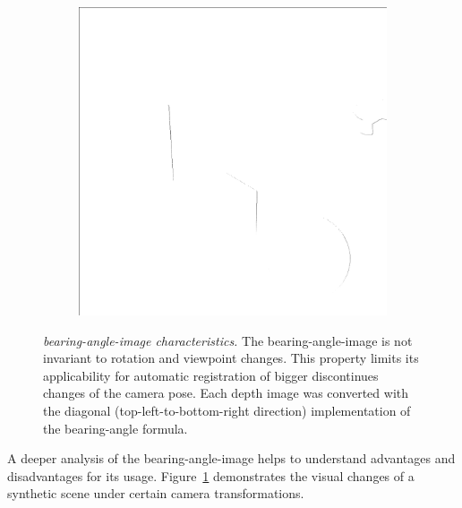 \begin{figure}[b!]
\begin{subfigure}[t]{0.32\textwidth}
    \end{subfigure}
    \begin{subfigure}[t]{0.32\textwidth}
        \includegraphics[width=\linewidth]{chapter04/img/bearing-diag-0210.png}
    \end{subfigure}
    \caption[\gls{bearing-angle-image} characteristics]{\emph{\gls{bearing-angle-image} characteristics.} The \gls{bearing-angle-image} is not invariant to rotation and viewpoint changes. This property limits its applicability for automatic registration of bigger discontinues changes of the camera pose. Each depth image was converted with the diagonal (top-left-to-bottom-right direction) implementation of the \gls{bearing-angle} formula.}\label{fig:bearing_characteristics}
\end{figure}
A deeper analysis of the \gls{bearing-angle-image} helps to understand advantages and disadvantages for its usage.
Figure~\ref{fig:bearing_characteristics} demonstrates the visual changes of a synthetic scene under certain camera transformations.

